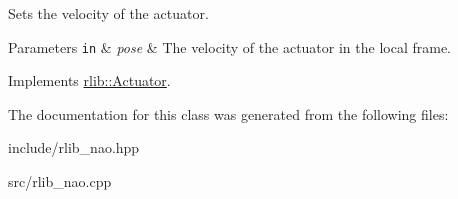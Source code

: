 Sets the velocity of the actuator. 


\begin{DoxyParams}[1]{Parameters}
\mbox{\tt in}  & {\em pose} & The velocity of the actuator in the local frame. \\
\hline
\end{DoxyParams}


Implements \hyperlink{classrlib_1_1Actuator_a8495e9dee469245fa6eba719b047cb3f}{rlib\-::\-Actuator}.



The documentation for this class was generated from the following files\-:\begin{DoxyCompactItemize}
\item 
include/rlib\-\_\-nao.\-hpp\item 
src/rlib\-\_\-nao.\-cpp\end{DoxyCompactItemize}
